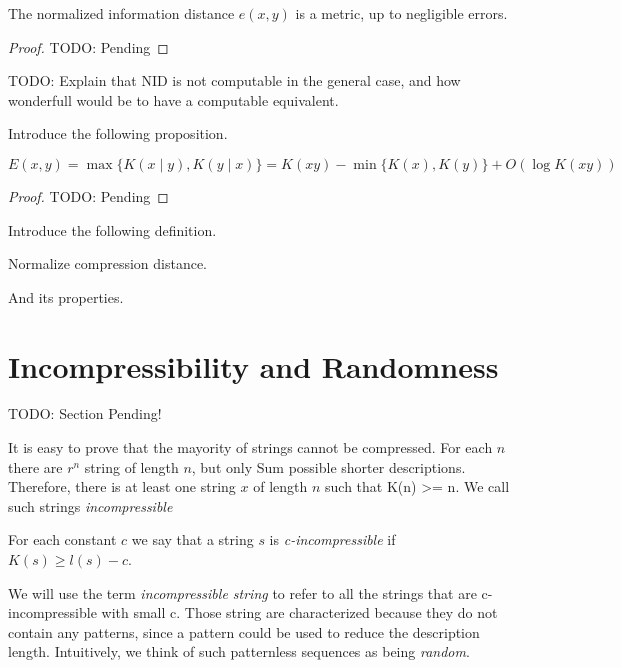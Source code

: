 \begin{proposition}
The normalized information distance $e(x, y)$ is a metric, up to negligible errors.
\end{proposition}
\begin{proof}
{\color{red} TODO: Pending}
\end{proof}

{\color{red} TODO: Explain that NID is not computable in the general case, and how wonderfull would be to have a computable equivalent.}

{\color{red} Introduce the following proposition.}

\begin{proposition}
\[
E(x, y) = \max\{ K(x \mid y), K(y \mid x) \} = K(xy) - \min\{ K(x), K(y) \} + O(\log K(xy) )
\]
\end{proposition}
\begin{proof}
{\color{red} TODO: Pending}
\end{proof}

{\color{red} Introduce the following definition.}

\begin{definition}
Normalize compression distance.
\end{definition}

{\color{red} And its properties.}


%
%

\section{Incompressibility and Randomness}
\label{sec:incompressibility_randomness}

{\color{red} TODO: Section Pending!}

It is easy to prove that the mayority of strings cannot be compressed. For each $n$ there are $r^n$ string of length $n$, but only Sum possible shorter descriptions. Therefore, there is at least one string $x$ of length $n$ such that K(n) >= n. We call such strings \emph{incompressible}

\begin{definition}
For each constant $c$ we say that a string $s$ is \emph{c-incompressible} if $K(s)\geq l(s)-c$.
\end{definition}

We will use the term \emph{incompressible string} to refer to all the strings that are c-incompressible with small c. Those string are characterized because they do not contain any patterns, since a pattern could be used to reduce the description length. Intuitively, we think of such patternless sequences as being \emph{random}.

